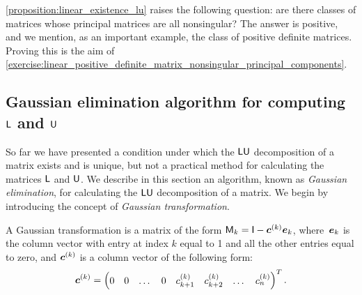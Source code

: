 
\cref{proposition:linear_existence_lu} raises the following question:
are there classes of matrices whose principal matrices are all nonsingular?
The answer is positive, and we mention,
as an important example, the class of positive definite matrices.
Proving this is the aim of \cref{exercise:linear_positive_definite_matrix_nonsingular_principal_components}.

\subsection*{Gaussian elimination algorithm for computing $\mathsf L$ and $\mathsf U$}%
\label{sub:gaussian_elimination_algorithm_for_computing_mat_l_and_mat_u_}

So far we have presented a condition under which the $\mathsf L \mathsf U$ decomposition of a matrix exists and is unique,
but not a practical method for calculating the matrices $\mathsf L$ and $\mathsf U$.
We describe in this section an algorithm,
known as \emph{Gaussian elimination},
for calculating the $\mathsf L \mathsf U$ decomposition of a matrix.
We begin by introducing the concept of \emph{Gaussian transformation}.
\begin{definition}
    A Gaussian transformation is a matrix of the form $\mathsf M_k = \mathsf I - \mathbf{\boldsymbol{c}}^{(k)} \mathbf{\boldsymbol{e}}_k$,
    where~$\mathbf{\boldsymbol{e}}_k$ is the column vector with entry at index $k$ equal to 1 and all the other entries equal to zero,
    and $\mathbf{\boldsymbol{c}}^{(k)}$ is a column vector of the following form:
    \[
        \mathbf{\boldsymbol{c}}^{(k)} =
        \begin{pmatrix}
            0 & 0 & \dots & 0 & c^{(k)}_{k+1} & c^{(k)}_{k+2} & \dots & c^{(k)}_n
        \end{pmatrix}^T.
    \]
\end{definition}

